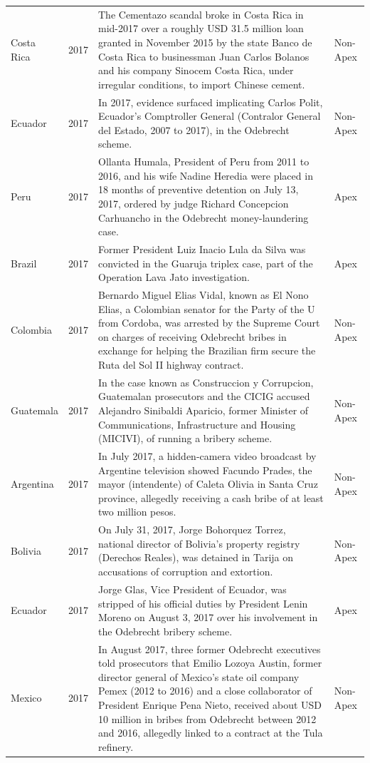 \begin{landscape}
\begin{longtable}{@{}l c p{15.5cm} l@{}}
Costa Rica & 2017 & The Cementazo scandal broke in Costa Rica in mid-2017 over a roughly USD 31.5 million loan granted in November 2015 by the state Banco de Costa Rica to businessman Juan Carlos Bolanos and his company Sinocem Costa Rica, under irregular conditions, to import Chinese cement. & Non-Apex \\
Ecuador & 2017 & In 2017, evidence surfaced implicating Carlos Polit, Ecuador's Comptroller General (Contralor General del Estado, 2007 to 2017), in the Odebrecht scheme. & Non-Apex \\
Peru & 2017 & Ollanta Humala, President of Peru from 2011 to 2016, and his wife Nadine Heredia were placed in 18 months of preventive detention on July 13, 2017, ordered by judge Richard Concepcion Carhuancho in the Odebrecht money-laundering case. & Apex \\
Brazil & 2017 & Former President Luiz Inacio Lula da Silva was convicted in the Guaruja triplex case, part of the Operation Lava Jato investigation. & Apex \\
Colombia & 2017 & Bernardo Miguel Elias Vidal, known as El Nono Elias, a Colombian senator for the Party of the U from Cordoba, was arrested by the Supreme Court on charges of receiving Odebrecht bribes in exchange for helping the Brazilian firm secure the Ruta del Sol II highway contract. & Non-Apex \\
Guatemala & 2017 & In the case known as Construccion y Corrupcion, Guatemalan prosecutors and the CICIG accused Alejandro Sinibaldi Aparicio, former Minister of Communications, Infrastructure and Housing (MICIVI), of running a bribery scheme. & Non-Apex \\
Argentina & 2017 & In July 2017, a hidden-camera video broadcast by Argentine television showed Facundo Prades, the mayor (intendente) of Caleta Olivia in Santa Cruz province, allegedly receiving a cash bribe of at least two million pesos. & Non-Apex \\
Bolivia & 2017 & On July 31, 2017, Jorge Bohorquez Torrez, national director of Bolivia's property registry (Derechos Reales), was detained in Tarija on accusations of corruption and extortion. & Non-Apex \\
Ecuador & 2017 & Jorge Glas, Vice President of Ecuador, was stripped of his official duties by President Lenin Moreno on August 3, 2017 over his involvement in the Odebrecht bribery scheme. & Apex \\
Mexico & 2017 & In August 2017, three former Odebrecht executives told prosecutors that Emilio Lozoya Austin, former director general of Mexico's state oil company Pemex (2012 to 2016) and a close collaborator of President Enrique Pena Nieto, received about USD 10 million in bribes from Odebrecht between 2012 and 2016, allegedly linked to a contract at the Tula refinery. & Non-Apex \\

\end{longtable}
\end{landscape}
